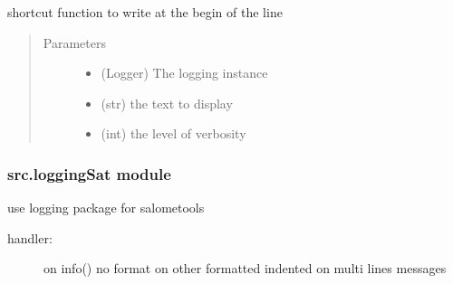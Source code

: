 \documentclass[a4paper,10pt,english]{sphinxmanual}
\begin{document}
\begin{fulllineitems}
\label{\detokenize{apidoc_src/src:src.fork.write_back}}
shortcut function to write at the begin of the line
\begin{quote}\begin{description}
\item[{Parameters}] \leavevmode\begin{itemize}
\item {} 
 \textendash{} (Logger) The logging instance

\item {} 
 \textendash{} (str) the text to display

\item {} 
 \textendash{} (int) the level of verbosity

\end{itemize}

\end{description}\end{quote}

\end{fulllineitems}



\subsubsection{src.loggingSat module}
\label{\detokenize{apidoc_src/src:module-src.loggingSat}}\label{\detokenize{apidoc_src/src:src-loggingsat-module}}

use logging package for salometools
\begin{description}
\item[{handler:}] \leavevmode
on info() no format
on other formatted indented on multi lines messages

\end{description}
\end{document}
